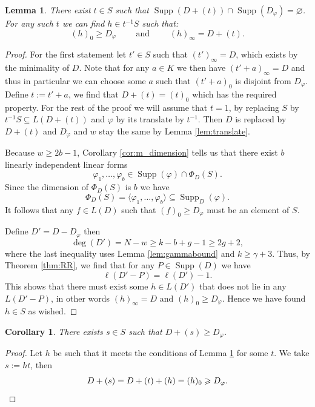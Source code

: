 \documentclass[12pt]{amsart}
\renewcommand{\geq}{\geqslant}
\DeclareMathOperator{\Supp}{Supp}
\newtheorem{lemma}[theorem]{Lemma}
\newtheorem{corollary}[theorem]{Corollary}
\theoremstyle{definition}
\begin{document}
	\begin{lemma}\label{lem:fixf}
		There exist $t \in S$ such that $\Supp(D + (t))\cap\Supp(D_\varphi) = \varnothing$. For any such $t$ we can find $h \in t^{-1}S$ such that: 
		$$(h)_0 \geq D_\varphi \qquad \text{ and } \qquad (h)_\infty = D  + (t).$$
	\end{lemma}
	\begin{proof}
		For the first statement let $t' \in S$ such that $(t')_\infty = D$, which exists by the minimality of $D$. Note that for any $a \in K$ we then have $(t' + a)_\infty = D$ and thus in particular we can choose some $a$ such that $(t'+a)_0$ is disjoint from $D_\varphi$. Define $t := t' + a$, we find that $D + (t) = (t)_0$ which has the required property. For the rest of the proof we will assume that $t = 1$, by replacing $S$ by $t^{-1}S \subseteq L(D + (t))$ and $\varphi$ by its translate by $t^{-1}$. Then $D$ is replaced by $D + (t)$ and $D_\varphi$ and $w$ stay the same by Lemma \ref{lem:translate}.
		
		Because $w \geq 2b-1$, Corollary \ref{cor:m_dimension} tells us that there exist $b$ linearly independent linear forms
		$$\varphi_1, \ldots, \varphi_{b} \in \Supp(\varphi) \cap \Phi_D(S).$$
		Since the dimension of $\Phi_D(S)$ is $b$ we have
		\begin{equation} \label{EQ:anSb}
			\Phi_D(S) = \langle \varphi_1, \ldots, \varphi_b \rangle \subseteq \Supp_D(\varphi).
		\end{equation}
		It follows that any $f \in L(D)$ such that $(f)_0 \geq D_\varphi$ must be an element of $S$. 
		
		Define $D' = D - D_\varphi$ then $$\deg(D') = N - w \geq k - b + g -1 \geq 2g+2,$$ where the last inequality uses Lemma \ref{lem:gammabound} and $k\geq \gamma +3$. Thus, by Theorem \ref{thm:RR}, we find that for any $P \in \Supp(D)$ we have
		$$\ell(D' - P) = \ell(D') - 1.$$ 
		This shows that there must exist some $h \in L(D')$ that does not lie in any $L(D'-P)$, in other words $(h)_\infty = D$ and $(h)_0 \geq D_\varphi$. Hence we have found $h \in S$ as wished.
	\end{proof}
	\begin{corollary} \label{cor:phis}
		There exists $s \in S$ such that $D + (s) \geq D_\varphi$.
	\end{corollary}
	\begin{proof}
		Let $h$ be such that it meets the conditions of Lemma \ref{lem:fixf} for some $t$. We take $s := ht$, then \begin{equation*}
			D + (s) = D + (t) + (h) = (h)_0 \geq D_\varphi. \qedhere \end{equation*}
	\end{proof}
	
\end{document}

